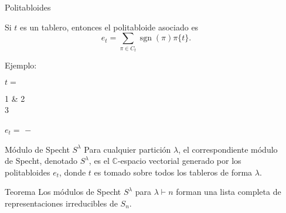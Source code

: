 \documentclass[final,xcolor=svgnames]{beamer}
\DeclareMathOperator{\sgn}{sgn}
\begin{document}
\begin{frame}{}
\begin{columns}
\begin{column}{0.5\textwidth}
      \begin{block}{Politabloides}
        \begin{minipage}{0.43\linewidth}
          Si $t$ es un tablero, entonces el \alert{politabloide}
          asociado es
        $$e_{t}=\sum_{\pi\in C_{t}}\sgn(\pi)\pi\{t\}.$$
      \end{minipage}
      \hspace{\fill}
      \begin{minipage}{0.53\linewidth}
        Ejemplo:

        \begin{center}
          \quad $t=$
          \begin{ytableau}
            1 & 2 \\
            3
          \end{ytableau}\qquad
          $e_{t}=$ 
           $-$ 
        \end{center}
      \end{minipage}
      \end{block}

      \begin{block}{Módulo de Specht $S^{\lambda}$}
        Para cualquier partición $\lambda$, el correspondiente
        \alert{módulo de Specht}, denotado $S^{\lambda}$, es el
        $\mathbb{C}$-espacio vectorial generado por los politabloides
        $e_{t}$, donde $t$ es tomado sobre todos los tableros de forma
        $\lambda$.
      \end{block} 

       \begin{block}{Teorema}
         Los módulos de Specht $S^{\lambda}$ para $\lambda\vdash n$
         forman una lista completa de representaciones irreducibles de
         $S_{n}$.
     \end{block}
    \end{column}

    \begin{column}{0.5\textwidth}
      

\end{column}
\end{columns}
\end{frame}
\end{document}
